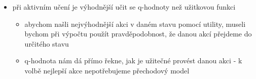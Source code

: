 \begin{itemize}
\begin{itemize}
\begin{itemize}
\begin{itemize}
\begin{itemize}
\end{itemize}
\end{itemize}
\item state-action-reward-state-action (SARSA)
\begin{itemize}
\item je to varianta Q-learningu
\item $Q(s,a)\leftarrow Q(s,a)+\alpha\cdot (R(s)+\gamma\cdot Q(s',a')-Q(s,a))$
\begin{itemize}
\item pravidlo se aplikuje na konci pětice $s,a,r,s',a'$, tedy po aplikaci akce $a'$
\end{itemize}
\end{itemize}
\item pro hladového agenta (který volí podle největšího $Q$) jsou algoritmy SARSA a základní Q-learning stejné
\begin{itemize}
\item rozdíl je vidět až u agenta, který není úplně hladový, ale provádí i průzkum (exploration)
\end{itemize}
\item u SARSA se bere v úvahu reálně zvolená akce
\begin{itemize}
\item SARSA je on-policy - jeho strategie se upravuje přímo za běhu algoritmu
\item Q-learning je off-policy - algoritmus se učí optimální strategii, ale během učení se může používat úplně jiná strategie
\end{itemize}
\end{itemize}
\item při aktivním učení je výhodnější učit se q-hodnoty než užitkovou funkci
\begin{itemize}
\item abychom našli nejvýhodnější akci v daném stavu pomocí utility, museli bychom při výpočtu použít pravděpodobnost, že danou akcí přejdeme do určitého stavu
\item q-hodnota nám dá přímo řekne, jak je užitečné provést danou akci - k volbě nejlepší akce nepotřebujeme přechodový model
\end{itemize}
\end{itemize}
\end{itemize}

